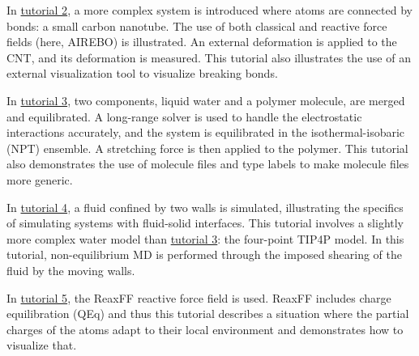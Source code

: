 \documentclass[9pt,tutorial]{livecoms}
\begin{document}
In \hyperref[carbon-nanotube-label]{tutorial 2}, a more complex system
is introduced where atoms are connected by bonds: a small carbon
nanotube. The use of both classical and reactive force fields (here,
AIREBO) is illustrated.  An external deformation is applied to the CNT,
and its deformation is measured.  This tutorial also illustrates the use
of an external visualization tool to visualize breaking bonds.

%

In \hyperref[all-atoms-label]{tutorial 3}, two components, liquid water
and a polymer molecule, are merged and equilibrated.  A long-range
solver is used to handle the electrostatic interactions accurately, and
the system is equilibrated in the isothermal-isobaric (NPT) ensemble. A
stretching force is then applied to the polymer.  This tutorial also
demonstrates the use of molecule files and type labels
\cite{typelabel_paper} to make molecule files more generic.

In \hyperref[sheared-confined-label]{tutorial 4}, a fluid confined by
two walls is simulated, illustrating the specifics of simulating systems
with fluid-solid interfaces.  This tutorial involves a slightly more
complex water model than \hyperref[all-atoms-label]{tutorial 3}: the
four-point TIP4P model.  In this tutorial, non-equilibrium MD is
performed through the imposed shearing of the fluid by the moving walls.

In \hyperref[reactive-silicon-dioxide-label]{tutorial 5}, the ReaxFF
reactive force field is used.  ReaxFF includes charge equilibration
(QEq) and thus this tutorial describes a situation where the partial
charges of the atoms adapt to their local environment and demonstrates
how to visualize that.
\end{document}
